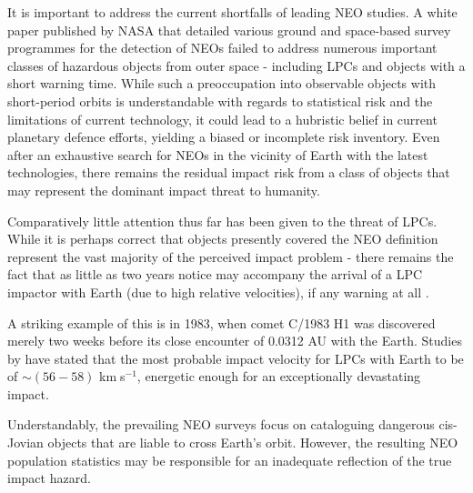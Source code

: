 It is important to address the current shortfalls of leading NEO studies. A white paper published by NASA that detailed various ground and space-based survey programmes for the detection of NEOs \cite{united2007near} failed to address numerous important classes of hazardous objects from outer space - including LPCs and objects with a short warning time. While such a preoccupation into observable objects with short-period orbits is understandable with regards to statistical risk and the limitations of current technology, it could lead to a hubristic belief in current planetary defence efforts, yielding a biased or incomplete risk inventory. Even after an exhaustive search for NEOs in the vicinity of Earth with the latest technologies, there remains the residual impact risk from a class of objects that may represent the dominant impact threat to humanity.


Comparatively little attention thus far has been given to the threat of LPCs. While it is perhaps correct that objects presently covered the NEO definition represent the vast majority of the perceived impact problem - there remains the fact that as little as two years notice may accompany the arrival of a LPC impactor with Earth (due to high relative velocities), if any warning at all \cite{1994hdtc.conf..221M}. 

A striking example of this is in 1983, when comet C/1983 H1 was discovered merely two weeks before its close encounter of 0.0312 AU with the Earth. %
Studies by \cite{1997NYASA.822...67W} have stated that the most probable impact velocity for LPCs with Earth to be of $\sim (56-58)$ km$\;$s$^{-1}$, energetic enough for an exceptionally devastating impact.

Understandably, the prevailing NEO surveys focus on cataloguing dangerous cis-Jovian objects that are liable to cross Earth's orbit. However, the resulting NEO population statistics may be responsible for an inadequate reflection of the true impact hazard.


